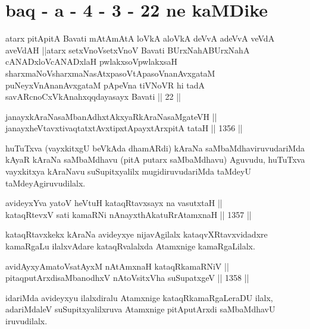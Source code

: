 \section*{baq - a - 4 - 3 - 22 ne kaMDike}

\begin{shl}
atarx pitApitA Bavati mAtAmAtA loVkA aloVkA deVvA adeVvA veVdA aveVdAH ||atarx setxVnoV\s setxVnoV Bavati BUrxNahABUrxNahA cANADxloV\s cANADxlaH pwlakxsoV\s pwlakxsaH sharxmaNoV\s sharxmaNasAtxpasoV\s tApasoV\s nanAvxgataM puNeyxVnAnanAvxgataM pApeVna tiVNoVR hi tadA savARcnoCxVkAnahxqqdayasayx Bavati || 22 ||
\end{shl}


\begin{shl}
janayxkAraNasaMbanAdhxtAkxyaRkAraNasaMgateVH || \\
janayxheVtavxtivaqtatxtAvxtipxtA\s payxtArxpitA tataH \hfill || 1356 ||  
\end{shl}

\begin{artha}
huTuTxva (vayxkitxgU beVkAda dhamARdi) kAraNa saMbaMdhaviruvudariMda kAyaR kAraNa saMbaMdhavu (pitA putarx saMbaMdhavu) Aguvudu, huTuTxva vayxkitxya kAraNavu suSupitxyalilx mugidiruvudariMda taMdeyU taMdeyAgiruvudilalx.
\end{artha}


\begin{shl}
avideyxYva yatoV heVtuH kataqRtavxsayx na vasutxtaH ||  \\
kataqRtevxV sati kamaRNi nAnayxthA\s katuRrAtamxnaH \hfill || 1357 ||  
\end{shl}

\begin{artha}
kataqRtavxkekx kAraNa avideyxye nijavAgilalx kataqvXRtavxvidadxre kamaRgaLu ilalxvAdare kataqRvalalxda Atamxnige kamaRgaLilalx.
\end{artha}

\begin{shl}
avidAyxyAmatoV\s satAyxM nA\s \s tAmxnaH kataqRkamaRNiV || \\
pitaqputArxdisaMbanodhxV nAtoV\s sitxVha suSupatxgeV \hfill || 1358 ||  
\end{shl}

\begin{artha}
idariMda avideyxyu ilalxdiralu Atamxnige kataqRkamaRgaLeraDU ilalx, adariMdaleV suSupitxyalilxruva Atamxnige pitAputArxdi saMbaMdhavU iruvudilalx.
\end{artha}

